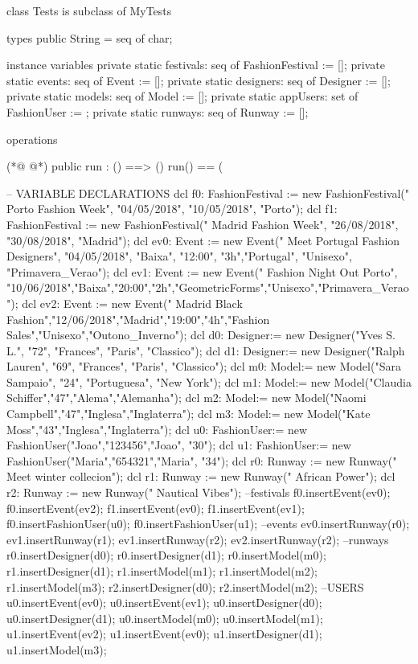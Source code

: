 \begin{vdmpp}[breaklines=true]
class Tests is subclass of MyTests

types
public String = seq of char;

instance variables
 private static festivals: seq of FashionFestival := [];
 private static events: seq of Event := [];
 private static designers: seq of Designer := [];
 private static models: seq of Model := [];
 private static appUsers: set of FashionUser := {};
  private static runways: seq of Runway := [];
 
 
operations

(*@
\label{run:17}
@*)
  public run : () ==> ()
  run() ==
  (
    
    -- VARIABLE DECLARATIONS
   dcl f0: FashionFestival := new FashionFestival(" Porto Fashion Week", "04/05/2018", "10/05/2018", "Porto");
   dcl f1: FashionFestival := new FashionFestival(" Madrid Fashion Week", "26/08/2018", "30/08/2018", "Madrid");
   dcl ev0: Event := new Event(" Meet Portugal Fashion Designers", "04/05/2018", "Baixa", "12:00", "3h","Portugal", "Unisexo", "Primavera_Verao");  
    dcl ev1: Event := new Event(" Fashion Night Out Porto", "10/06/2018","Baixa","20:00","2h","GeometricForms","Unisexo","Primavera_Verao");
   dcl ev2: Event := new Event(" Madrid Black Fashion","12/06/2018","Madrid","19:00","4h","Fashion Sales","Unisexo","Outono_Inverno");         
    dcl d0: Designer:= new Designer("Yves S. L.", "72", "Frances", "Paris", "Classico");
    dcl d1: Designer:= new Designer("Ralph Lauren", "69", "Frances", "Paris", "Classico");
    dcl m0: Model:= new Model("Sara Sampaio", "24", "Portuguesa", "New York");             
    dcl m1: Model:= new Model("Claudia Schiffer","47","Alema","Alemanha");
   dcl m2: Model:= new Model("Naomi Campbell","47","Inglesa","Inglaterra");
   dcl m3: Model:= new Model("Kate Moss","43","Inglesa","Inglaterra");
   dcl u0: FashionUser:= new FashionUser("Joao","123456","Joao", "30");
   dcl u1: FashionUser:= new FashionUser("Maria","654321","Maria", "34");
   dcl r0: Runway := new Runway(" Meet winter collecion");
   dcl r1: Runway := new Runway(" African Power");
   dcl r2: Runway := new Runway(" Nautical Vibes");
  --festivals
   f0.insertEvent(ev0);
    f0.insertEvent(ev2);
    f1.insertEvent(ev0);
    f1.insertEvent(ev1);
    f0.insertFashionUser(u0);
    f0.insertFashionUser(u1);
  --events
  ev0.insertRunway(r0);
   ev1.insertRunway(r1);
   ev1.insertRunway(r2);
   ev2.insertRunway(r2);
  --runways
   r0.insertDesigner(d0);
   r0.insertDesigner(d1);
   r0.insertModel(m0);
   r1.insertDesigner(d1);
   r1.insertModel(m1);
   r1.insertModel(m2);
   r1.insertModel(m3);
   r2.insertDesigner(d0);
   r2.insertModel(m2);
   --USERS
   u0.insertEvent(ev0);
   u0.insertEvent(ev1);
   u0.insertDesigner(d0);
    u0.insertDesigner(d1);
    u0.insertModel(m0);
   u0.insertModel(m1); 
    u1.insertEvent(ev2);
   u1.insertEvent(ev0);
    u1.insertDesigner(d1);
   u1.insertModel(m3); 
     

\end{vdmpp}
